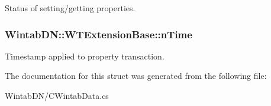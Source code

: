 Status of setting/getting properties. 

\hypertarget{struct_wintab_d_n_1_1_w_t_extension_base_aff83fb6aa04f9b5938c0a76fe25ca653}{
\subsubsection[{nTime}]{ {\bf WintabDN::WTExtensionBase::nTime}}}
\label{struct_wintab_d_n_1_1_w_t_extension_base_aff83fb6aa04f9b5938c0a76fe25ca653}


Timestamp applied to property transaction. 



The documentation for this struct was generated from the following file:\begin{DoxyCompactItemize}
\item 
WintabDN/CWintabData.cs\end{DoxyCompactItemize}
